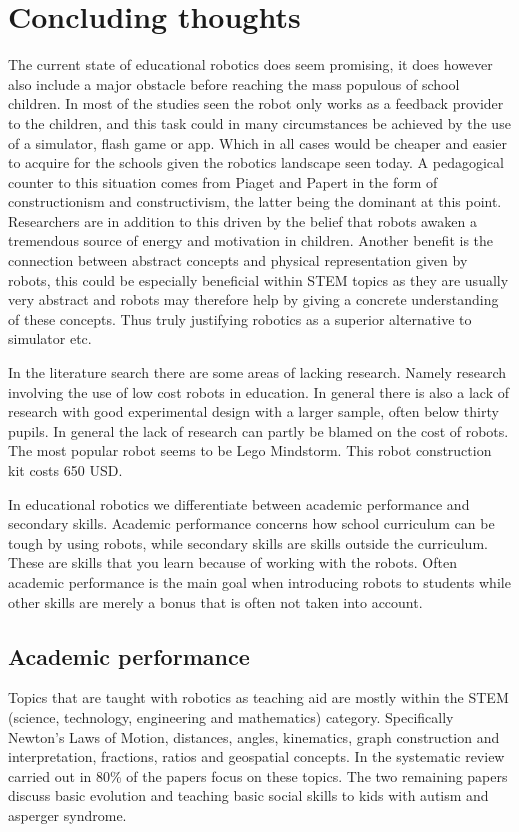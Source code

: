 \chapter{Concluding thoughts}\label{ch:literatureConclusion}
The current state of educational robotics does seem promising, it does however also include a major obstacle before reaching the mass populous of school children.
In most of the studies seen the robot only works as a feedback provider to the children, and this task could in many circumstances be achieved by the use of 
a simulator, flash game or app. Which in all cases would be cheaper and easier to acquire for the schools given the robotics landscape seen today.
A pedagogical counter to this situation comes from Piaget and Papert in the form of constructionism and constructivism, the latter being the dominant at this point. 
Researchers are in addition to this driven by the belief that robots awaken a tremendous source of energy and motivation in children. 
Another benefit is the connection between abstract concepts and physical representation given by robots, this could be especially beneficial within STEM topics as 
they are usually very abstract and robots may therefore help by giving a concrete understanding of these concepts. 
Thus truly justifying robotics as a superior alternative to simulator etc. 

\bigskip\noindent
In the literature search there are some areas of lacking research. Namely research involving the use of low cost robots in education. In general there is also a lack of research with good experimental design with a larger sample, often below thirty pupils. 
In general the lack of research can partly be blamed on the cost of robots. The most popular robot seems to be Lego Mindstorm. This robot construction kit costs 650 USD. 

\bigskip\noindent
In educational robotics we differentiate between academic performance and secondary skills. Academic performance concerns how school curriculum can be tough by using robots, while secondary skills are skills outside the curriculum. These are skills that you learn because of working with the robots. Often academic performance is the main goal when introducing robots to students while other skills are merely a bonus that is often not taken into account. 

\section{Academic performance}
Topics that are taught with robotics as teaching aid are mostly within the STEM (science, technology, engineering and mathematics) category. Specifically Newton's Laws of Motion, distances, angles, kinematics, graph construction and interpretation, fractions, ratios and geospatial concepts. In the systematic review carried out in \cite{Benitti2012978} 80\% of the papers focus on these topics. The two remaining papers discuss basic evolution and teaching basic social skills to kids with autism and asperger syndrome. 

